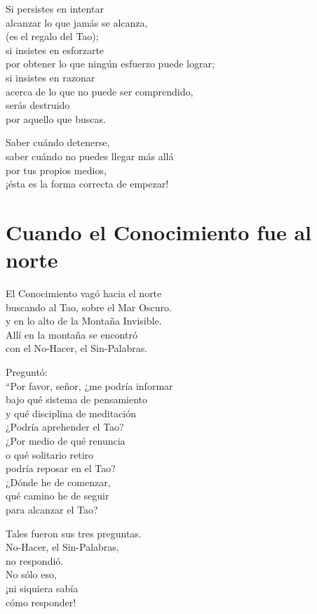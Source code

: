 \documentclass[book,b5paper,hidelinks,final]{memoir}
\begin{document}
	Si persistes en intentar\\
	alcanzar lo que jamás se alcanza,\\
	(es el regalo del Tao);\\
	si insistes en esforzarte\\
	por obtener lo que ningún esfuerzo puede lograr;\\
	si insistes en razonar\\
	acerca de lo que no puede ser comprendido,\\
	serás destruido\\
	por aquello que buscas.
	
	Saber cuándo detenerse,\\
	saber cuándo no puedes llegar más allá\\
	por tus propios medios,\\
	¡ésta es la forma correcta de empezar!
	
	\chapter*{Cuando el Conocimiento fue al norte}
	
	El Conocimiento vagó hacia el norte\\
	buscando al Tao, sobre el Mar Oscuro.\\
	y en lo alto de la Montaña Invisible.\\
	Allí en la montaña se encontró\\
	con el No-Hacer, el Sin-Palabras.
	
	Preguntó:\\
	``Por favor, señor, ¿me podría informar\\
	bajo qué sistema de pensamiento\\
	y qué disciplina de meditación\\
	¿Podría aprehender el Tao?\\
	¿Por medio de qué renuncia\\
	o qué solitario retiro\\
	podría reposar en el Tao?\\
	¿Dónde he de comenzar,\\
	qué camino he de seguir\\
	para alcanzar el Tao?
	
	Tales fueron sus tres preguntas.\\
	No-Hacer, el Sin-Palabras,\\
	no respondió.\\
	No sólo eso,\\
	¡ni siquiera sabía\\
	cómo responder!
	
\end{document}
